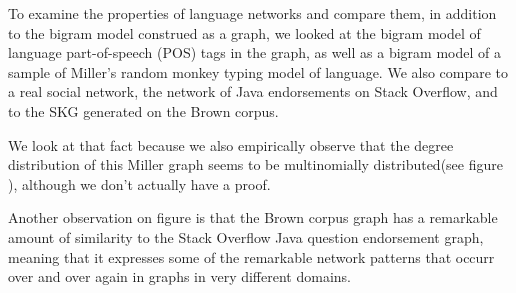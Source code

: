 \documentclass[12pt]{article}
\begin{document}
To examine the properties of language networks and compare them, in addition to the bigram model construed as a graph, we looked at the bigram model of language part-of-speech (POS) tags in the graph, as well as a bigram model of a sample of Miller's random monkey typing model of language. We also compare to a real social network, the network of Java endorsements on Stack Overflow, and to the SKG generated on the Brown corpus.%


We look at that fact because we also empirically observe that the degree distribution of this Miller graph seems to be multinomially distributed(see figure \label{fig:plots}), although we don't actually have a proof.

Another observation on figure \label{fig:plots} is that the Brown corpus graph has a remarkable amount of similarity to the Stack Overflow Java question endorsement graph, meaning that it expresses some of the remarkable network patterns that occurr over and over again in graphs in very different domains. %
\end{document}
